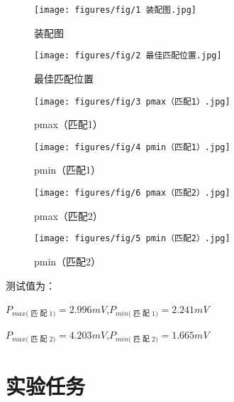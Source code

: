 \documentclass[12pt,hyperref,a4paper,UTF8]{ctexart}
\begin{document}
\begin{figure}[H]
    \centering
    \begin{minipage}{.33\textwidth}
        \centering
        \texttt{[image: figures/fig/1 装配图.jpg]}
        \caption{装配图}
        \label{fig:assembly}
    \end{minipage}%
    \begin{minipage}{.33\textwidth}
        \centering
        \texttt{[image: figures/fig/2 最佳匹配位置.jpg]}
        \caption{最佳匹配位置}
        \label{fig:best-match}
    \end{minipage}%
    \begin{minipage}{.33\textwidth}
        \centering
        \texttt{[image: figures/fig/3 pmax（匹配1）.jpg]}
        \caption{pmax（匹配1）}
        \label{fig:pmax-match1}
    \end{minipage}
\end{figure}


\begin{figure}[H]
    \centering
    \begin{minipage}{.33\textwidth}
        \centering
        \texttt{[image: figures/fig/4 pmin（匹配1）.jpg]}
        \caption{pmin（匹配1）}
        \label{fig:pmin-match1}
    \end{minipage}%
    \begin{minipage}{.33\textwidth}
        \centering
        \texttt{[image: figures/fig/6 pmax（匹配2）.jpg]}
        \caption{pmax（匹配2）}
        \label{fig:pmax-match2}
    \end{minipage}%
    \begin{minipage}{.33\textwidth}
        \centering
        \texttt{[image: figures/fig/5 pmin（匹配2）.jpg]}
        \caption{pmin（匹配2）}
        \label{fig:pmin-match2}
    \end{minipage}
\end{figure}


测试值为：

$P_{max\text{( 匹 配 1)}}=2.996mV$,$P_{min\text{( 匹 配 1)}}=2.241mV$

$P_{max\text{( 匹 配 2)}}=4.203mV$,$P_{min\text{( 匹 配 2)}}=1.665mV$

\newpage

\section{实验任务}
\end{document}
